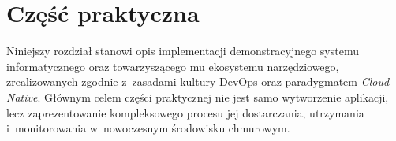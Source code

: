 \newpage
\section{Część praktyczna}
Niniejszy rozdział stanowi opis implementacji demonstracyjnego systemu informatycznego oraz towarzyszącego mu ekosystemu narzędziowego, zrealizowanych zgodnie z~zasadami kultury DevOps oraz paradygmatem \textit{Cloud Native}. Głównym celem części praktycznej nie jest samo wytworzenie aplikacji, lecz zaprezentowanie kompleksowego procesu jej dostarczania, utrzymania i~monitorowania w~nowoczesnym środowisku chmurowym.
